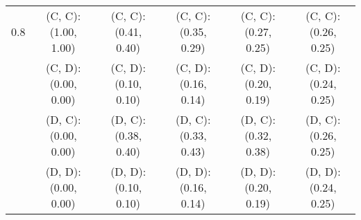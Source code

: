 \begin{tabular}{c | c c c c c}
\hline
0.8 & (C, C): (1.00, 1.00) & (C, C): (0.41, 0.40) & (C, C): (0.35, 0.29) & (C, C): (0.27, 0.25) & (C, C): (0.26, 0.25) \\
 & (C, D): (0.00, 0.00) & (C, D): (0.10, 0.10) & (C, D): (0.16, 0.14) & (C, D): (0.20, 0.19) & (C, D): (0.24, 0.25) \\
 & (D, C): (0.00, 0.00) & (D, C): (0.38, 0.40) & (D, C): (0.33, 0.43) & (D, C): (0.32, 0.38) & (D, C): (0.26, 0.25) \\
 & (D, D): (0.00, 0.00) & (D, D): (0.10, 0.10) & (D, D): (0.16, 0.14) & (D, D): (0.20, 0.19) & (D, D): (0.24, 0.25) \\
\end{tabular}
